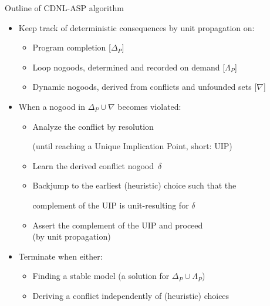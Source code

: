 \begin{frame}{Outline of CDNL-ASP algorithm}
\begin{itemize}
\item Keep track of deterministic consequences by unit propagation on:
  \begin{itemize}
  \item Program completion \hfill [$\Delta_P$]%
  \item Loop nogoods, determined and recorded on demand \hfill [$\Lambda_P$]%
  \item Dynamic nogoods, derived from conflicts and unfounded sets \hfill[$\nabla$]%
  \end{itemize}
\pause
\item When a nogood in $\Delta_P\cup\nabla$ becomes \alert<2>{violated}:
  \begin{itemize}
  \item \alert<2>{Analyze} the conflict by resolution
    \par
    (until reaching a {Unique Implication Point}, short: UIP)
  \item \alert<2>{Learn} the derived conflict nogood~$\delta$
  \item \alert<2>{Backjump} to the earliest (heuristic) choice such that
        the\par complement of the UIP is unit-resulting for $\delta$
  \item \alert<2>{Assert} the complement of the UIP and proceed\\
        (by unit propagation)
  \end{itemize}
\pause
\item Terminate when either:
  \begin{itemize}
  \item Finding a stable model (a solution for $\Delta_P\cup\Lambda_P$)
  \item Deriving a conflict independently of (heuristic) choices
  \end{itemize}
\end{itemize}
\end{frame}
\begin{frame}[c]%
\SetAlFnt{\scriptsize}

\end{frame}
